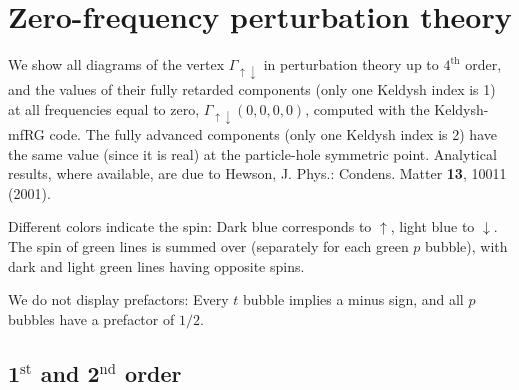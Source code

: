 \documentclass[10pt]{scrartcl}
\newcommand{\updown}{_{\uparrow\downarrow}}
\begin{document}
\section*{Zero-frequency perturbation theory}

We show all diagrams of the vertex $\Gamma\updown$ in perturbation theory up to $4^\text{th}$ order, and the values of their fully retarded components (only one Keldysh index is 1) at all frequencies equal to zero, $\Gamma\updown(0,0,0,0)$, computed with the Keldysh-mfRG code. The fully advanced components (only one Keldysh index is 2) have the same value (since it is real) at the particle-hole symmetric point. Analytical results, where available, are due to Hewson, J. Phys.: Condens. Matter \textbf{13}, 10011 (2001).

Different colors indicate the spin: Dark blue corresponds to $\uparrow$, light blue to $\downarrow$. The spin of green lines is summed over (separately for each green $p$ bubble), with dark and light green lines having opposite spins.

We do not display prefactors: Every $t$ bubble implies a minus sign, and all $p$ bubbles have a prefactor of $1/2$.

\subsection*{1$^\text{st}$ and 2$^\text{nd}$ order}
\end{document}
